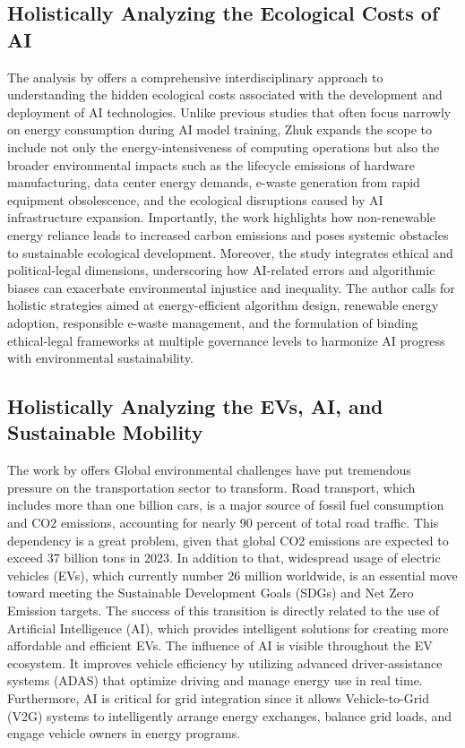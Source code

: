 \documentclass[a4paper, 12pt]{article}
\begin{document}
\subsection{Holistically Analyzing the Ecological Costs of AI}
The analysis by \citet{Zhuk2023} offers a comprehensive interdisciplinary approach to understanding the hidden ecological costs associated with the development and deployment of AI technologies. Unlike previous studies that often focus narrowly on energy consumption during AI model training, Zhuk expands the scope to include not only the energy-intensiveness of computing operations but also the broader environmental impacts such as the lifecycle emissions of hardware manufacturing, data center energy demands, e-waste generation from rapid equipment obsolescence, and the ecological disruptions caused by AI infrastructure expansion. Importantly, the work highlights how non-renewable energy reliance leads to increased carbon emissions and poses systemic obstacles to sustainable ecological development. Moreover, the study integrates ethical and political-legal dimensions, underscoring how AI-related errors and algorithmic biases can exacerbate environmental injustice and inequality. The author calls for holistic strategies aimed at energy-efficient algorithm design, renewable energy adoption, responsible e-waste management, and the formulation of binding ethical-legal frameworks at multiple governance levels to harmonize AI progress with environmental sustainability.

\subsection{Holistically Analyzing the EVs, AI, and Sustainable Mobility}
The work by \citet{M.rauf2024} offers Global environmental challenges have put tremendous pressure on the transportation sector to transform.  Road transport, which includes more than one billion cars, is a major source of fossil fuel consumption and CO2 emissions, accounting for nearly 90 percent of total road traffic. This dependency is a great problem, given that global CO2 emissions are expected to exceed 37 billion tons in 2023. In addition to that, widespread usage of electric vehicles (EVs), which currently number 26 million worldwide, is an essential move toward meeting the Sustainable Development Goals (SDGs) and Net Zero Emission targets.  The success of this transition is directly related to the use of Artificial Intelligence (AI), which provides intelligent solutions for creating more affordable and efficient EVs. The influence of AI is visible throughout the EV ecosystem. It improves vehicle efficiency by utilizing advanced driver-assistance systems (ADAS) that optimize driving and manage energy use in real time.  Furthermore, AI is critical for grid integration since it allows Vehicle-to-Grid (V2G) systems to intelligently arrange energy exchanges, balance grid loads, and engage vehicle owners in energy programs.
\end{document}
